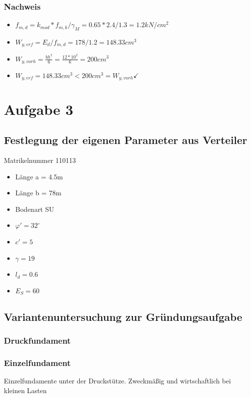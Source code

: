 \documentclass[11pt,fleqn,a4paper,halfparskip]{article}
\begin{document}
\subsubsection*{Nachweis}
\begin{itemize}
\item[] $f_{m,d} = k_{mod} * f_{m,k} / \gamma_M = 0.65*2.4/1.3 = 1.2kN/cm^2$
\item[] $W_{y,erf} = E_d/f_{m,d} = 178/1.2 = 148.33cm^3$
\item[] $W_{y,vorh} = \frac{bh^2}{6} = \frac{12*10^2}{6} = 200cm^3$
\item[] $W_{y,erf} = 148.33cm^3 < 200cm^3 = W_{y,vorh}\checkmark$
\end{itemize}
\newpage
\pagestyle{empty}



\pagestyle{plain}

\section{Aufgabe 3}
\subsection*{Festlegung der eigenen Parameter aus Verteiler}
Matrikelnummer 110113
\begin{itemize}
\item Länge a = 4.5m
\item Länge b = 78m
\item Bodenart SU
\item $\varphi' = 32^\circ$
\item $c' = 5$
\item $\gamma = 19$
\item $l_d = 0.6$
\item $E_S = 60$
\end{itemize}
\subsection{Variantenuntersuchung zur Gründungsaufgabe}
\subsubsection{Druckfundament}
\subsubsection*{Einzelfundament}
Einzelfundamente unter der Druckstütze. Zweckmäßig und wirtschaftlich bei kleinen Lasten
\end{document}
